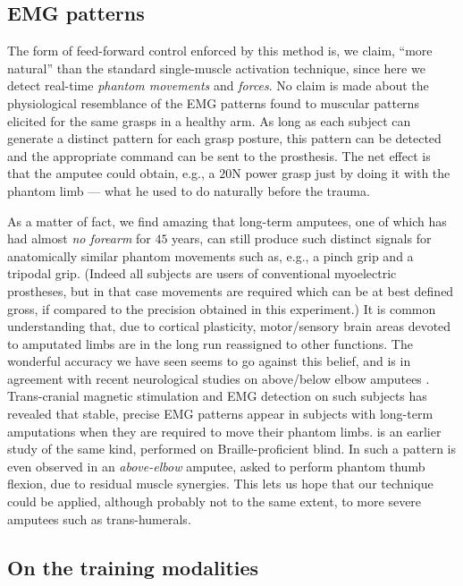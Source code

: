 \subsection{EMG patterns}

The form of feed-forward control enforced by this method is, we claim, ``more
natural'' than the standard single-muscle activation technique, since here
we detect real-time \emph{phantom movements} and \emph{forces}.
No claim is made about the physiological resemblance of the EMG patterns found
to muscular patterns elicited for the same grasps in a healthy arm. As long as
each subject can generate a distinct pattern for each grasp posture, this pattern
can be detected and the appropriate command can be sent to the prosthesis.
The net effect is that the amputee could obtain, e.g., a $20$N power grasp just
by doing it with the phantom limb --- what he used to do naturally before the trauma.

As a matter of fact, we find amazing that long-term amputees, one of which has
had almost \emph{no forearm} for $45$ years, can still produce such distinct signals
for anatomically similar phantom movements such as, e.g., a pinch grip and a
tripodal grip. (Indeed all subjects are users of conventional myoelectric
prostheses, but in that case movements are required which can be at
best defined gross, if compared to the precision obtained in this experiment.)
It is common understanding that, due to cortical plasticity, motor/sensory brain
areas devoted to amputated limbs are in the long run reassigned to other
functions. The wonderful accuracy we have seen seems to go against this belief,
and is in agreement with recent neurological studies on above/below elbow
amputees \cite{sirigu1,sirigu2}. Trans-cranial magnetic stimulation and EMG detection
on such subjects has revealed that stable, precise EMG patterns appear in subjects with long-term
amputations when they are required to move their phantom limbs. \cite{pascual} is
an earlier study of the same kind, performed on Braille-proficient blind.
In \cite{sirigu2} such a pattern is even observed in an \emph{above-elbow} amputee, asked to perform
phantom thumb flexion, due to residual muscle synergies. This lets us hope that
our technique could be applied, although probably not to the same extent, to more
severe amputees such as trans-humerals.

\subsection{On the training modalities}

